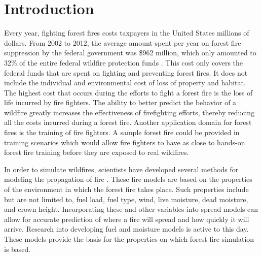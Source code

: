 \chapter{Introduction}

Every year, fighting forest fires costs taxpayers in the United States millions of dollars. From 2002 to 2012, the average amount spent per year on forest fire suppression by the federal government was \$962 million, which only amounted to 32\% of the entire federal wildfire protection funds \cite{forestcost}. This cost only covers the federal funds that are spent on fighting and preventing forest fires. It does not include the individual and environmental cost of loss of property and habitat. The highest cost that occurs during the efforts to fight a forest fire is the loss of life incurred by fire fighters. The ability to better predict the behavior of a wildfire greatly increases the effectiveness of firefighting efforts, thereby reducing all the costs incurred during a forest fire. Another application domain for forest fires is the training of fire fighters. A sample forest fire could be provided in training scenarios which would allow fire fighters to have as close to hands-on forest fire training before they are exposed to real wildfires. 

In order to simulate wildfires, scientists have developed several methods for modeling the propagation of fire \cite{roth}\cite{BEHAVE}. These fire models are based on the properties of the environment in which the forest fire takes place. Such properties include but are not limited to, fuel load, fuel type, wind, live moisture, dead moisture, and crown height. Incorporating these and other variables into spread models can allow for accurate prediction of where a fire will spread and how quickly it will arrive. Research into developing fuel and moisture models is active to this day. These models provide the basis for the properties on which forest fire simulation is based.

